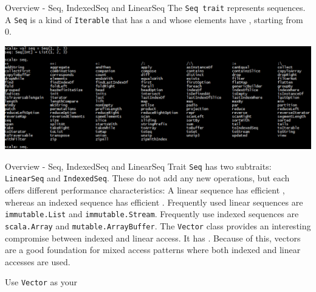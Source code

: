 \begin{frame}[fragile]{Overview - Seq, IndexedSeq and LinearSeq}
The \lstinline!Seq trait! represents sequences. A \lstinline!Seq! is a kind of
\lstinline!Iterable! that has a  and whose elements have
, starting from 0.\\
\begin{center}
\includegraphics[width = \textwidth]{resources/Seq.png}
\end{center}
\end{frame}

\begin{frame}[fragile]{Overview - Seq, IndexedSeq and LinearSeq}
Trait \lstinline!Seq! has two subtraits: \lstinline!LinearSeq! and
\lstinline!IndexedSeq!. These do not add any new operations, but each offers
different performance characteristics: A linear sequence has efficient
, whereas an indexed sequence has efficient
. Frequently used
linear sequences are \lstinline!immutable.List! and
\lstinline!immutable.Stream!. Frequently use  indexed sequences are
\lstinline!scala.Array! and \lstinline!mutable.ArrayBuffer!.
\newline
\newline
The \lstinline!Vector! class provides an interesting compromise between indexed
and linear access. It has . Because of this, vectors are
a good foundation for mixed access patterns where both indexed and linear
accesses are used.\\
\begin{center}
Use \lstinline!Vector! as your 
\end{center}
\end{frame}

